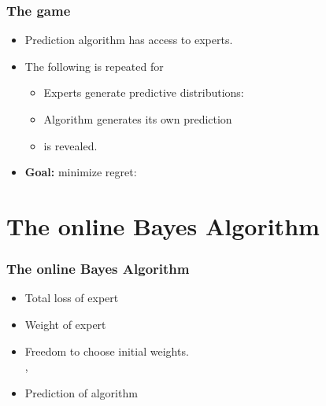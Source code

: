 \documentclass[handout]{beamer}
\begin{document}
\begin{frame}
\frametitle{The game}
\begin{itemize}
\item Prediction algorithm  has access to  experts.
\item The following is repeated for 
\begin{itemize}
\item Experts generate predictive distributions: 
\item Algorithm generates its own prediction 
\item {} is revealed.
\end{itemize}
\item {\bf Goal:} minimize regret:
\R{\[
-\sum_{t=1}^T \log p_A^t(c^t) + \min_{i=1,\dots,N} \paren{-\sum_{t=1}^T \log p_i^t(c^t)} 
\]}
\end{itemize}
\end{frame}

\section{The online Bayes Algorithm}

\begin{frame}
\frametitle{The online Bayes Algorithm}
\begin{itemize}
\item {\color{blue} Total loss} of expert 
\item {\color{blue}Weight} of expert 
\item
Freedom to choose initial weights.\\
 , 
\item {\color{blue}Prediction} of algorithm 
\R{\[
\vp_A^t = \frac{\sum_{i=1}^N \wt{t}{i} \vp_i^t}{\sum_{i=1}^N \wt{t}{i}}
\]}
\end{itemize}
\end{frame}

\end{document}
